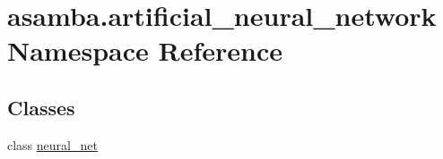 \hypertarget{namespaceasamba_1_1artificial__neural__network}{}\section{asamba.\+artificial\+\_\+neural\+\_\+network Namespace Reference}
\label{namespaceasamba_1_1artificial__neural__network}
\subsection*{Classes}
\begin{DoxyCompactItemize}
\item 
class \hyperlink{classasamba_1_1artificial__neural__network_1_1neural__net}{neural\+\_\+net}
\begin{DoxyCompactList}\small\item\em \paragraph*{}

\subsection*{}

\subsection*{}

\subsection*{}

\subsection*{}

\subsection*{}

\subparagraph*{}\end{DoxyCompactList}\end{DoxyCompactItemize}
